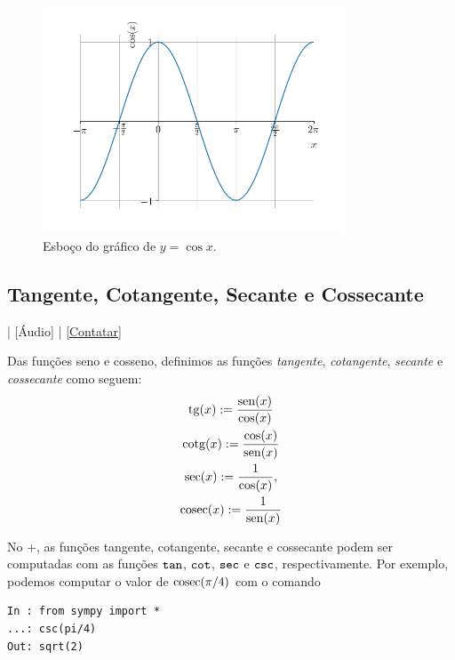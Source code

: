 \begin{figure}[H]
  \centering
  \includegraphics[width=0.8\textwidth]{./cap_funcao/dados/fig_cos_seno_graficos/fig_cosseno_grafico}
  \caption{Esboço do gráfico de $y=\cos x$.}
\end{figure}


\subsection{Tangente, Cotangente, Secante e Cossecante}

\begin{flushright}
  [Vídeo] | [Áudio] | \href{https://phkonzen.github.io/notas/contato.html}{[Contatar]}
\end{flushright}

Das funções seno e cosseno, definimos as funções \emph{tangente}, \emph{cotangente}, \emph{secante} e \emph{cossecante} como seguem:
\begin{gather}
  \operatorname{tg}(x) := \frac{\operatorname{sen}(x)}{\cos(x)}\\
  \operatorname{cotg}(x) := \frac{\cos(x)}{\operatorname{sen}(x)}\\
  \sec(x) := \frac{1}{\cos(x)},\\
  \operatorname{cosec}(x) := \frac{1}{\operatorname{sen}(x)}
\end{gather}

\ifispython
No {\python}+{\sympy}, as funções tangente, cotangente, secante e cossecante podem ser computadas com as funções $\verb+tan+$, $\verb+cot+$, $\verb+sec+$ e $\verb+csc+$, respectivamente. Por exemplo, podemos computar o valor de $\operatorname{cosec}(\pi/4)$ com o comando
\begin{lstlisting}
In : from sympy import *
...: csc(pi/4)
Out: sqrt(2)
\end{lstlisting}
\fi

